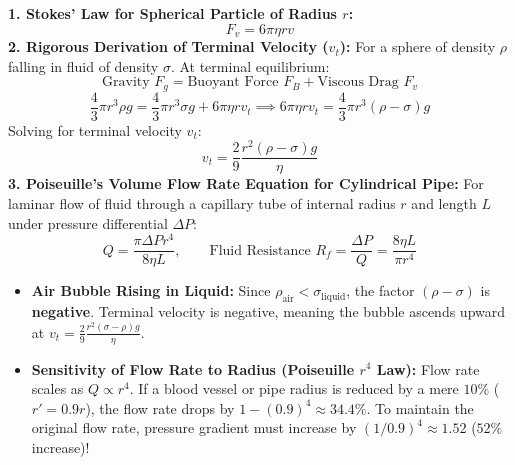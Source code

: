 \documentclass[10pt,a4paper]{article}
\begin{document}
\begin{formulabox}
\textbf{1. Stokes' Law for Spherical Particle of Radius $r$:}
\begin{equation}
  F_v = 6\pi\eta r v
\end{equation}
\textbf{2. Rigorous Derivation of Terminal Velocity ($v_t$):}
For a sphere of density $\rho$ falling in fluid of density $\sigma$. At terminal equilibrium:
\begin{equation}
  \text{Gravity } F_g = \text{Buoyant Force } F_B + \text{Viscous Drag } F_v
\end{equation}
\begin{equation}
  \frac{4}{3}\pi r^3 \rho g = \frac{4}{3}\pi r^3 \sigma g + 6\pi\eta r v_t \implies 6\pi\eta r v_t = \frac{4}{3}\pi r^3(\rho - \sigma)g
\end{equation}
Solving for terminal velocity $v_t$:
\begin{equation}
  v_t = \frac{2}{9}\frac{r^2(\rho - \sigma)g}{\eta}
\end{equation}
\textbf{3. Poiseuille's Volume Flow Rate Equation for Cylindrical Pipe:}
For laminar flow of fluid through a capillary tube of internal radius $r$ and length $L$ under pressure differential $\Delta P$:
\begin{equation}
  Q = \frac{\pi \Delta P r^4}{8\eta L}, \qquad \text{Fluid Resistance } R_f = \frac{\Delta P}{Q} = \frac{8\eta L}{\pi r^4}
\end{equation}
\end{formulabox}

\begin{trapbox}
\begin{itemize}
  \item \textbf{Air Bubble Rising in Liquid:} Since $\rho_{\text{air}} < \sigma_{\text{liquid}}$, the factor $(\rho - \sigma)$ is \textbf{negative}. Terminal velocity is negative, meaning the bubble ascends upward at $v_t = \frac{2}{9}\frac{r^2(\sigma - \rho)g}{\eta}$.
  \item \textbf{Sensitivity of Flow Rate to Radius (Poiseuille $r^4$ Law):} Flow rate scales as $Q \propto r^4$. If a blood vessel or pipe radius is reduced by a mere $10\%$ ($r' = 0.9r$), the flow rate drops by $1 - (0.9)^4 \approx 34.4\%$. To maintain the original flow rate, pressure gradient must increase by $(1/0.9)^4 \approx 1.52$ ($52\%$ increase)!
\end{itemize}
\end{trapbox}
\end{document}
